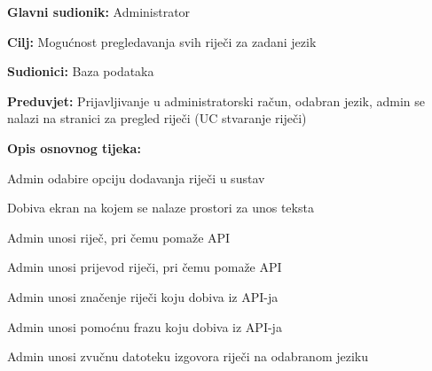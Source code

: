 \noindent {}
\begin{packed_item}

	\item \textbf{Glavni sudionik: } Administrator
	\item \textbf{Cilj: } Mogućnost pregledavanja svih riječi za zadani jezik
	\item \textbf{Sudionici: } Baza podataka
	\item \textbf{Preduvjet: } Prijavljivanje u administratorski račun, odabran jezik, admin se nalazi na stranici za pregled riječi (UC stvaranje riječi)	
	\item  \textbf{Opis osnovnog tijeka:}
	
	\item[] \begin{packed_enum}
		
		\item Admin odabire opciju dodavanja riječi u sustav
		\item Dobiva ekran na kojem se nalaze prostori za unos teksta
		\item Admin unosi riječ, pri čemu pomaže API
		\item Admin unosi prijevod riječi, pri čemu pomaže API
		\item Admin unosi značenje riječi koju dobiva iz API-ja
		\item Admin unosi pomoćnu frazu koju dobiva iz API-ja
		\item Admin unosi zvučnu datoteku izgovora riječi na odabranom jeziku

	\end{packed_enum}
	
\end{packed_item}


